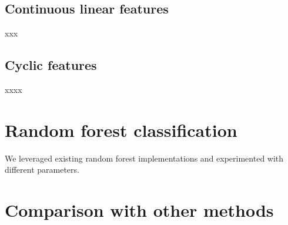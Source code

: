 \documentclass{article}
\begin{document}
\begin{multicols}{2}
\subsection{Continuous linear features}

xxx

\subsection{Cyclic features}

xxxx

\section{Random forest classification}

We leveraged existing random forest implementations
and experimented with different parameters.

\section{Comparison with other methods}

\end{multicols}
\end{document}
